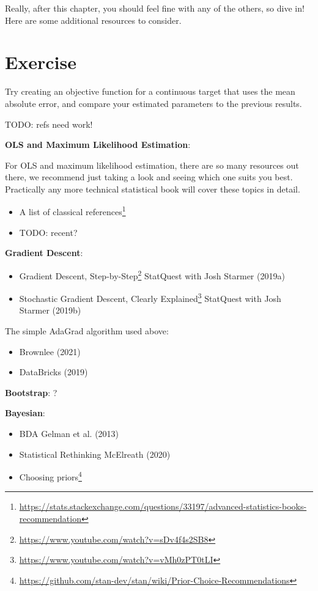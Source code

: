 \documentclass[
  letterpaper,
]{krantz}
\providecommand{\tightlist}{%
  \setlength{\itemsep}{0pt}\setlength{\parskip}{0pt}}\usepackage{longtable,booktabs,array}
\DeclareRobustCommand{\href}[2]{#2\footnote{\url{#1}}}
\begin{document}
Really, after this chapter, you should feel fine with any of the others,
so dive in! Here are some additional resources to consider.

\section{Exercise}\label{exercise}

Try creating an objective function for a continuous target that uses the
mean absolute error, and compare your estimated parameters to the
previous results.

TODO: refs need work!

\textbf{OLS and Maximum Likelihood Estimation}:

For OLS and maximum likelihood estimation, there are so many resources
out there, we recommend just taking a look and seeing which one suits
you best. Practically any more technical statistical book will cover
these topics in detail.

\begin{itemize}
\tightlist
\item
  \href{https://stats.stackexchange.com/questions/33197/advanced-statistics-books-recommendation}{A
  list of classical references}
\item
  TODO: recent?
\end{itemize}

\textbf{Gradient Descent}:

\begin{itemize}
\tightlist
\item
  \href{https://www.youtube.com/watch?v=sDv4f4s2SB8}{Gradient Descent,
  Step-by-Step} StatQuest with Josh Starmer (2019a)
\item
  \href{https://www.youtube.com/watch?v=vMh0zPT0tLI}{Stochastic Gradient
  Descent, Clearly Explained} StatQuest with Josh Starmer (2019b)
\end{itemize}

The simple AdaGrad algorithm used above:

\begin{itemize}
\tightlist
\item
  Brownlee (2021)
\item
  DataBricks (2019)
\end{itemize}

\textbf{Bootstrap}: ?

\textbf{Bayesian}:

\begin{itemize}
\tightlist
\item
  BDA Gelman et al. (2013)
\item
  Statistical Rethinking McElreath (2020)
\item
  \href{https://github.com/stan-dev/stan/wiki/Prior-Choice-Recommendations}{Choosing
  priors}
\end{itemize}
\end{document}
